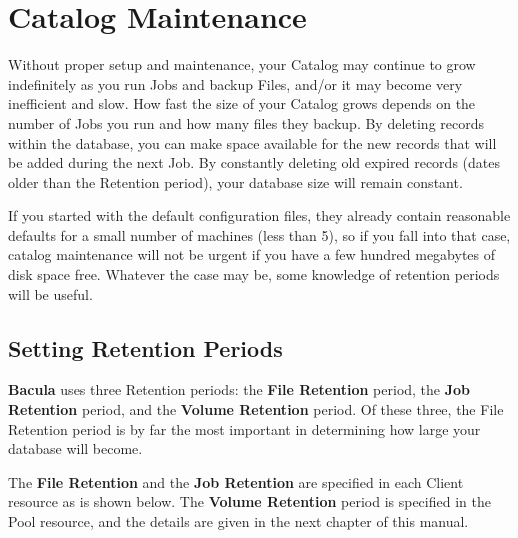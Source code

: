 
\chapter{Catalog Maintenance}
\label{CatMaintenanceChapter}

Without proper setup and maintenance, your Catalog may continue to grow
indefinitely as you run Jobs and backup Files, and/or it may become
very inefficient and slow. How fast the size of your
Catalog grows depends on the number of Jobs you run and how many files they
backup. By deleting records within the database, you can make space available
for the new records that will be added during the next Job. By constantly
deleting old expired records (dates older than the Retention period), your
database size will remain constant. 

If you started with the default configuration files, they already contain
reasonable defaults for a small number of machines (less than 5), so if you
fall into that case, catalog maintenance will not be urgent if you have a few
hundred megabytes of disk space free. Whatever the case may be, some knowledge
of retention periods will be useful. 
\label{Retention}

\section{Setting Retention Periods}

{\bf Bacula} uses three Retention periods: the {\bf File Retention} period,
the {\bf Job Retention} period, and the {\bf Volume Retention} period. Of
these three, the File Retention period is by far the most important in
determining how large your database will become. 

The {\bf File Retention} and the {\bf Job Retention} are specified in each
Client resource as is shown below. The {\bf Volume Retention} period is
specified in the Pool resource, and the details are given in the next chapter
of this manual. 

